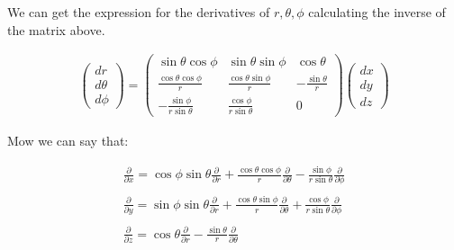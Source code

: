 
We can get the expression for the derivatives of $r,\theta,\phi$ calculating the inverse of the matrix above.

\begin{equation}
  \begin{array}{c}
    \left(\begin{matrix}
      dr\\
      d\theta\\
      d\phi
    \end{matrix}
    \right) =
    \left(\begin{matrix}
      \sin{\theta}\cos{\phi} & \sin{\theta}\sin{\phi} & \cos{\theta} \\
      \frac{\cos{\theta}\cos{\phi}}{r} & \frac{\cos{\theta}\sin{\phi}}{r} & -\frac{\sin{\theta}}{r} \\
      -\frac{\sin{\phi}}{r\sin{\theta}} & \frac{\cos{\phi}}{r\sin{\theta}} & 0
    \end{matrix}\right)
    \left(\begin{matrix}
      dx\\
      dy\\
      dz
    \end{matrix}\right)
  \end{array}
\end{equation}

Mow we can say that:

\begin{equation}
  \begin{array}{c}
    \frac{\partial}{\partial x} = \cos{\phi}\sin{\theta}\frac{\partial}{\partial r} + \frac{\cos{\theta}\cos{\phi}}{r} \frac{\partial}{\partial \theta} - \frac{\sin{\phi}}{r\sin{\theta}} \frac{\partial}{\partial \phi}
    \\

    \\
    \frac{\partial}{\partial y} = \sin{\phi}\sin{\theta}\frac{\partial}{\partial r} + \frac{\cos{\theta}\sin{\phi}}{r} \frac{\partial}{\partial \theta} + \frac{\cos{\phi}}{r\sin{\theta}} \frac{\partial}{\partial \phi}
    \\

    \\
    \frac{\partial}{\partial z} = \cos{\theta}\frac{\partial}{\partial r} - \frac{\sin{\theta}}{r} \frac{\partial}{\partial \theta}
  \end{array}
\end{equation}

